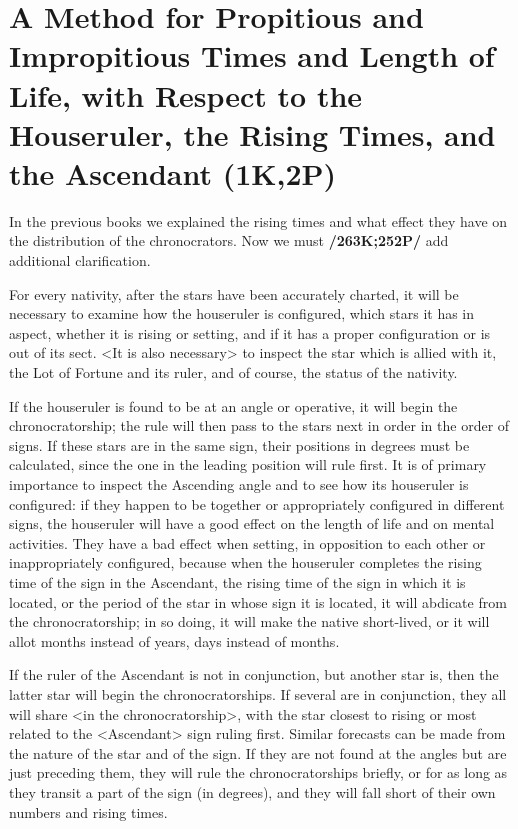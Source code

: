 \section{A Method for Propitious and Impropitious Times and Length of Life, with Respect to the Houseruler, the Rising Times, and the Ascendant (1K,2P)}

In the previous books we explained the rising times and what effect they have on the distribution of the chronocrators. Now we must \textbf{/263K;252P/} add additional clarification. 

For every nativity, after the stars  have been accurately charted, it will be necessary to examine how the houseruler is configured, which stars
it has in aspect, whether it is rising or setting, and if it has a proper configuration or is out of its sect. <It is also necessary> to inspect the star which is allied with it, the Lot of Fortune and its ruler, and of course, the status of the nativity.

If the houseruler is found to be at an angle or operative, it will begin the chronocratorship; the rule will then pass to the stars next in order in the order of signs. If these stars are in the same sign, their positions
in degrees must be calculated, since the one in the leading position will rule first. It is of primary importance to inspect the Ascending angle and to see how its houseruler is configured: if they happen to be together or appropriately configured in different signs, the houseruler will have a good effect on the length of life and on mental activities. They have a bad effect when setting, in opposition to each other or inappropriately configured, because when the houseruler completes the rising time of the sign in the Ascendant, the rising time of the sign in which it is located, or the period of the star in whose sign it is located, it will abdicate from the chronocratorship; in so doing, it will make the native short-lived, or it will allot months instead of years, days instead of months.

If the ruler of the Ascendant is not in conjunction, but another star is, then the latter star will begin the chronocratorships. If several are in conjunction, they all will share <in the chronocratorship>, with the star closest to rising or most related to the <Ascendant> sign ruling first. Similar forecasts can be made from the nature of the star and of the sign. If they are not found at the angles but are just preceding them, they will rule the chronocratorships briefly, or for as long as they transit a part of the sign (in degrees), and they will fall short of their own numbers and rising times.

